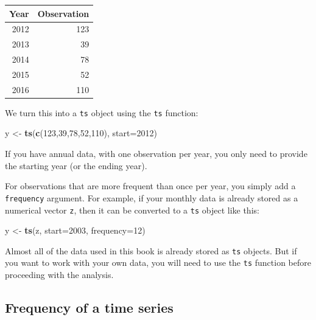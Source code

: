 \documentclass[]{book}
\newenvironment{Shaded}{\begin{snugshade}}{\end{snugshade}}
\newcommand{\DataTypeTok}[1]{\textcolor[rgb]{0.13,0.29,0.53}{#1}}
\newcommand{\DecValTok}[1]{\textcolor[rgb]{0.00,0.00,0.81}{#1}}
\newcommand{\KeywordTok}[1]{\textcolor[rgb]{0.13,0.29,0.53}{\textbf{#1}}}
\newcommand{\NormalTok}[1]{#1}
\newcommand{\StringTok}[1]{\textcolor[rgb]{0.31,0.60,0.02}{#1}}
\begin{document}
\begin{tabular}{rr}
\toprule
Year & Observation\\
\midrule
2012 & 123\\
2013 & 39\\
2014 & 78\\
2015 & 52\\
2016 & 110\\
\bottomrule
\end{tabular}

We turn this into a \texttt{ts} object using the \texttt{ts} function:

\begin{Shaded}
\begin{Highlighting}[]
\NormalTok{y <-}\StringTok{ }\KeywordTok{ts}\NormalTok{(}\KeywordTok{c}\NormalTok{(}\DecValTok{123}\NormalTok{,}\DecValTok{39}\NormalTok{,}\DecValTok{78}\NormalTok{,}\DecValTok{52}\NormalTok{,}\DecValTok{110}\NormalTok{), }\DataTypeTok{start=}\DecValTok{2012}\NormalTok{)}
\end{Highlighting}
\end{Shaded}

If you have annual data, with one observation per year, you only need to provide the starting year (or the ending year).

For observations that are more frequent than once per year, you simply add a \texttt{frequency} argument. For example, if your monthly data is already stored as a numerical vector \texttt{z}, then it can be converted to a \texttt{ts} object like this:

\begin{Shaded}
\begin{Highlighting}[]
\NormalTok{y <-}\StringTok{ }\KeywordTok{ts}\NormalTok{(z, }\DataTypeTok{start=}\DecValTok{2003}\NormalTok{, }\DataTypeTok{frequency=}\DecValTok{12}\NormalTok{)}
\end{Highlighting}
\end{Shaded}

Almost all of the data used in this book is already stored as \texttt{ts} objects. But if you want to work with your own data, you will need to use the \texttt{ts} function before proceeding with the analysis.

\hypertarget{frequency-of-a-time-series}{%
\subsection*{Frequency of a time series}\label{frequency-of-a-time-series}}
\end{document}
